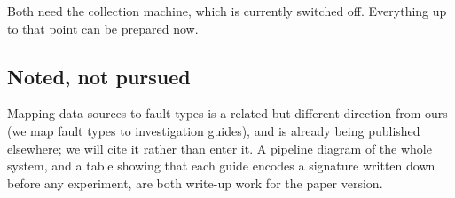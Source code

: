 \noindent
Both need the collection machine, which is currently switched off. Everything up to
that point can be prepared now.

\subsection{Noted, not pursued}

Mapping data sources to fault types is a related but different direction from ours
(we map fault types to investigation guides), and is already being published
elsewhere; we will cite it rather than enter it. A pipeline diagram of the whole
system, and a table showing that each guide encodes a signature written down before
any experiment, are both write-up work for the paper version.
